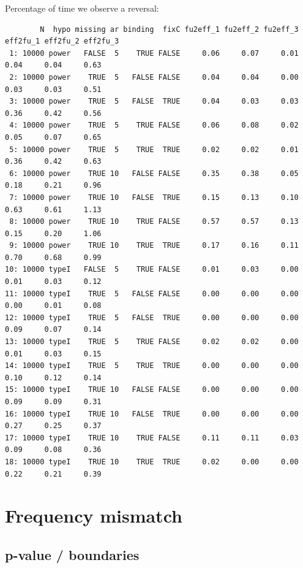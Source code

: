 \documentclass[12pt]{article}
\begin{document}
Percentage of time we observe a reversal:
\begin{adjustwidth}{-1cm}{-1cm}
\begin{verbatim}
        N  hypo missing ar binding  fixC fu2eff_1 fu2eff_2 fu2eff_3 eff2fu_1 eff2fu_2 eff2fu_3
 1: 10000 power   FALSE  5    TRUE FALSE     0.06     0.07     0.01     0.04     0.04     0.63
 2: 10000 power    TRUE  5   FALSE FALSE     0.04     0.04     0.00     0.03     0.03     0.51
 3: 10000 power    TRUE  5   FALSE  TRUE     0.04     0.03     0.03     0.36     0.42     0.56
 4: 10000 power    TRUE  5    TRUE FALSE     0.06     0.08     0.02     0.05     0.07     0.65
 5: 10000 power    TRUE  5    TRUE  TRUE     0.02     0.02     0.01     0.36     0.42     0.63
 6: 10000 power    TRUE 10   FALSE FALSE     0.35     0.38     0.05     0.18     0.21     0.96
 7: 10000 power    TRUE 10   FALSE  TRUE     0.15     0.13     0.10     0.63     0.61     1.13
 8: 10000 power    TRUE 10    TRUE FALSE     0.57     0.57     0.13     0.15     0.20     1.06
 9: 10000 power    TRUE 10    TRUE  TRUE     0.17     0.16     0.11     0.70     0.68     0.99
10: 10000 typeI   FALSE  5    TRUE FALSE     0.01     0.03     0.00     0.01     0.03     0.12
11: 10000 typeI    TRUE  5   FALSE FALSE     0.00     0.00     0.00     0.00     0.01     0.08
12: 10000 typeI    TRUE  5   FALSE  TRUE     0.00     0.00     0.00     0.09     0.07     0.14
13: 10000 typeI    TRUE  5    TRUE FALSE     0.02     0.02     0.00     0.01     0.03     0.15
14: 10000 typeI    TRUE  5    TRUE  TRUE     0.00     0.00     0.00     0.10     0.12     0.14
15: 10000 typeI    TRUE 10   FALSE FALSE     0.00     0.00     0.00     0.09     0.09     0.31
16: 10000 typeI    TRUE 10   FALSE  TRUE     0.00     0.00     0.00     0.27     0.25     0.37
17: 10000 typeI    TRUE 10    TRUE FALSE     0.11     0.11     0.03     0.09     0.08     0.36
18: 10000 typeI    TRUE 10    TRUE  TRUE     0.02     0.00     0.00     0.22     0.21     0.39
\end{verbatim}

\end{adjustwidth}


\clearpage

\section{Frequency mismatch}
\label{sec:orgc9c9aca}

\subsection{p-value / boundaries}
\label{sec:orgf752fd4}
\end{document}
